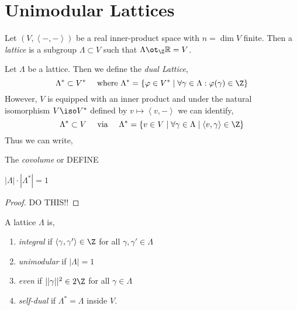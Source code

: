 \documentclass[12pt]{article}
\begin{document}
\section{Unimodular Lattices}

\newcommand{\inner}[2]{\left< #1, #2 \right>}
\newcommand{\R}{\mathbb{R}}
\newcommand{\h}{\mathfrak{h}}

\begin{defn}
Let $(V, \inner{-}{-})$ be a real inner-product space with $n = \dim{V}$ finite. Then a \textit{lattice} is a subgroup $\Lambda \subset V$ such that $\Lambda \ot_{\Z} \R = V$.  
\end{defn}

\begin{defn}
Let $\Lambda$ be a lattice. Then we define the \textit{dual Lattice},
\[ \Lambda^* \subset V^* \quad \text{ where } \Lambda^* = \{ \varphi \in V^* \mid \forall \gamma \in \Lambda : \varphi(\gamma) \in \Z \} \]
However, $V$ is equipped with an inner product and under the natural isomorphism $V \iso V^*$ defined by $v \mapsto \inner{v}{-}$ we can identify,
\[ \Lambda^* \subset V \quad \text{ via } \quad \Lambda^* = \{ v \in V \mid \forall \gamma \in \Lambda \mid \inner{v}{\gamma} \in \Z \} \]
Thus we can write,
\begin{center}
\end{center}
\end{defn}

\begin{defn}
The \textit{covolume} or DEFINE
\end{defn}

\begin{prop}
$|\Lambda| \cdot |\Lambda^*| = 1$
\end{prop}

\begin{proof}
DO THIS!!
\end{proof}

\begin{defn}
A lattice $\Lambda$ is,
\begin{enumerate}
\item \textit{integral} if $\inner{\gamma}{\gamma'} \in \Z$ for all $\gamma, \gamma' \in \Lambda$
\item \textit{unimodular} if $|\Lambda| = 1$
\item \textit{even} if $|| \gamma ||^2 \in 2 \Z$ for all $\gamma \in \Lambda$
\item \textit{self-dual} if $\Lambda^* = \Lambda$ inside $V$.
\end{enumerate}
\end{defn}
\end{document}
